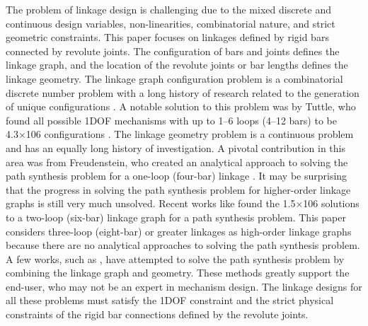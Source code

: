 The problem of linkage design is challenging due to the mixed discrete and continuous design variables, non-linearities, combinatorial nature, and strict geometric constraints. This paper focuses on linkages defined by rigid bars connected by revolute joints. The configuration of bars and joints defines the linkage graph, and the location of the revolute joints or bar lengths defines the linkage geometry. The linkage graph configuration problem is a combinatorial discrete number problem with a long history of research related to the generation of unique configurations \cite{mruthyunjaya_kinematic_2003}. A notable solution to this problem was by Tuttle, who found all possible 1DOF mechanisms with up to 1–6 loops (4–12 bars) to be 4.3×106 configurations \cite{tuttle_generation_1996}. The linkage geometry problem is a continuous problem and has an equally long history of investigation. A pivotal contribution in this area was from Freudenstein, who created an analytical approach to solving the path synthesis problem for a one-loop (four-bar) linkage \cite{FerdinandFreudenstein1955}. It may be surprising that the progress in solving the path synthesis problem for higher-order linkage graphs is still very much unsolved. Recent works like  \cite{plecnik_designing_2020} found the 1.5×106 solutions to a two-loop (six-bar) linkage graph for a path synthesis problem. This paper considers three-loop (eight-bar) or greater linkages as high-order linkage graphs because there are no analytical approaches to solving the path synthesis problem. A few works, such as \cite{lipson_evolutionary_2008, vermeer_kinematic_2018, pan_joint_2022}, have attempted to solve the path synthesis problem by combining the linkage graph and geometry. These methods greatly support the end-user, who may not be an expert in mechanism design. The linkage designs for all these problems must satisfy the 1DOF constraint and the strict physical constraints of the rigid bar connections defined by the revolute joints.

